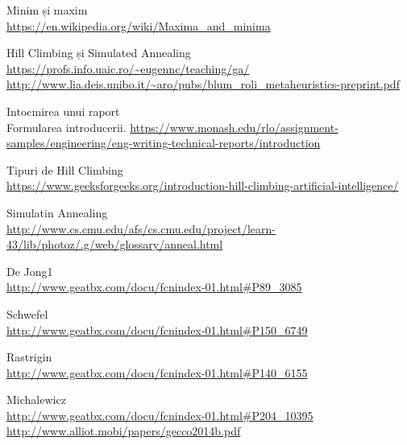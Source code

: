 \documentclass{article}
\begin{document}
\begin{thebibliography}{9}

  Minim și maxim\\
  \url{https://en.wikipedia.org/wiki/Maxima_and_minima}

  Hill Climbing și Simulated Annealing\\
  \url{https://profs.info.uaic.ro/~eugennc/teaching/ga/}\\
  \url{http://www.lia.deis.unibo.it/~aro/pubs/blum_roli_metaheuristics-preprint.pdf}
  
  \begin{flushleft}
  Intocmirea unui raport \\ Formularea introducerii.
  \url{https://www.monash.edu/rlo/assignment-samples/engineering/eng-writing-technical-reports/introduction}
  \end{flushleft}
  
  Tipuri de Hill Climbing\\
  \url{https://www.geeksforgeeks.org/introduction-hill-climbing-artificial-intelligence/}
  
  Simulatin Annealing\\
  \url{http://www.cs.cmu.edu/afs/cs.cmu.edu/project/learn-43/lib/photoz/.g/web/glossary/anneal.html}
  
  De Jong1\\
  \url{http://www.geatbx.com/docu/fcnindex-01.html#P89_3085}
  
  Schwefel\\
  \url{http://www.geatbx.com/docu/fcnindex-01.html#P150_6749}
  
  Rastrigin\\
  \url{http://www.geatbx.com/docu/fcnindex-01.html#P140_6155}
  
  Michalewicz\\
  \url{http://www.geatbx.com/docu/fcnindex-01.html#P204_10395}\\
  \url{http://www.alliot.mobi/papers/gecco2014b.pdf}
  
  
\end{thebibliography}  
\end{document}
